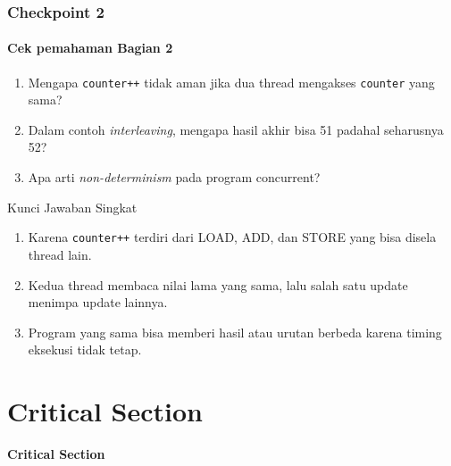 \documentclass[t,aspectratio=169,xcolor=dvipsnames]{beamer}
\begin{document}
\begin{frame}
    \frametitle{Checkpoint 2}
    \framesubtitle{Cek pemahaman Bagian 2}
    \small

    \begin{enumerate}
        \item Mengapa \texttt{counter++} tidak aman jika dua thread mengakses \texttt{counter} yang sama?
        \item Dalam contoh \textit{interleaving}, mengapa hasil akhir bisa 51 padahal seharusnya 52?
        \item Apa arti \textit{non-determinism} pada program concurrent?
    \end{enumerate}

    \vspace{0.3cm}
    \begin{block}{Kunci Jawaban Singkat}
        \begin{enumerate}
            \item Karena \texttt{counter++} terdiri dari LOAD, ADD, dan STORE yang bisa disela thread lain.
            \item Kedua thread membaca nilai lama yang sama, lalu salah satu update menimpa update lainnya.
            \item Program yang sama bisa memberi hasil atau urutan berbeda karena timing eksekusi tidak tetap.
        \end{enumerate}
    \end{block}
\end{frame}

\section{Critical Section}

\begin{frame}[plain]
    \begin{center}
        \vspace{3cm}
        \Huge\textbf{Critical Section}
    \end{center}
\end{frame}
\end{document}
